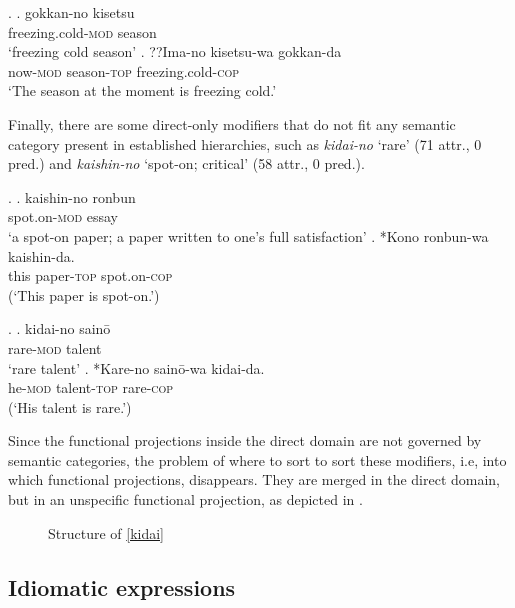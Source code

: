 \ex. \ag. gokkan-no kisetsu\\
freezing.cold-\textsc{mod} season\\
`freezing cold season'
\bg. ??Ima-no kisetsu-wa gokkan-da\\
now-\textsc{mod} season-\textsc{top} freezing.cold-\textsc{cop}\\
`The season at the moment is freezing cold.’

Finally, there are some direct-only modifiers that do not fit any semantic category present in established hierarchies, such as \textit{kidai-no} `rare’ (71 attr., 0 pred.) and \textit{kaishin-no} `spot-on; critical’ (58 attr., 0 pred.).

\ex. \ag. kaishin-no ronbun\\
spot.on-\textsc{mod} essay\\
`a spot-on paper; a paper written to one's full satisfaction'
\bg. *Kono ronbun-wa kaishin-da.\\
this paper-\textsc{top} spot.on-\textsc{cop}\\
(`This paper is spot-on.’)

\ex. \ag. kidai-no sainō\\
rare-\textsc{mod} talent\\
`rare talent’ \label{kidai}
\bg. *Kare-no sainō-wa kidai-da.\\
he-\textsc{mod} talent-\textsc{top} rare-\textsc{cop}\\
(`His talent is rare.’)

Since the functional projections inside the direct domain are not governed by semantic categories, the problem of where to sort to sort these modifiers, i.e, into which functional projections, disappears. They are merged in the direct domain, but in an unspecific functional projection, as depicted in .

\begin{figure}
\centering
{}
\caption{Structure of \ref{kidai}}
\label{Structure of kidai-no saino}
\end{figure}

\subsection{Idiomatic expressions} \label{idiomatic}


